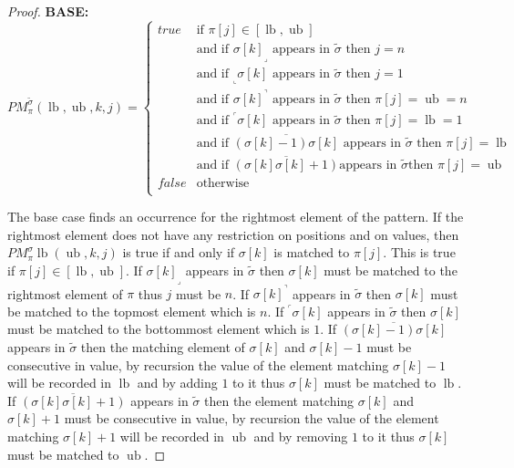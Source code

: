 \documentclass[a4paper]{llncs}
\newcommand{\ptext}{\pi}
\newcommand{\ppattern}{\sigma}
\newcommand{\PM}{PM}
\DeclareMathOperator{\lb}{lb}
\DeclareMathOperator{\ub}{ub}
\begin{document}
\begin{proof}
\noindent\textbf{BASE:} \\
$$
\PM^{\widetilde{\sigma}}_{\ptext}(\lb,\ub,k,j)=
\begin{cases}
	true 	& \text{if $\ptext[j] \in [\lb,\ub ]$}\\
			& \text{and if ${\ppattern[k]}_\lrcorner$ appears in $\widetilde{\sigma}$ then $j=n$}\\
			& \text{and if $_\llcorner{\sigma[k]}$ appears in $\widetilde{\sigma}$ then $j=1$}\\
			& \text{and if ${\ppattern[k]}^\urcorner$ appears in $\widetilde{\sigma}$ then $\ptext[j]=\ub=n$}\\
			& \text{and if  $^\ulcorner{\ppattern[k]}$ appears in $\widetilde{\sigma}$ then $\ptext[j]=\lb=1$ } \\
			& \text{and if  $\overline{(\ppattern[k]-1)\ppattern[k]}$ appears in $\widetilde{\sigma}$ then $\ptext[j]=\lb$ }  \\
			& \text{and if  $\overline{(\ppattern[k]\ppattern[k]+1)}$
			appears in $\widetilde{\sigma}$
			then $\ptext[j]=\ub$}  \\

	false	& \text{otherwise} \\
\end{cases}
$$

The base case finds an occurrence for the rightmost element of the pattern. If the rightmost element does not have any restriction on positions and on values, then $\PM^{\sigma}_{\ptext}{\lb}(\ub,k,j)$ is true if and only if $\ppattern[k]$ is matched to $\ptext[j]$. This is true if $\ptext[j] \in [\lb,\ub]$. If ${\ppattern[k]}_\lrcorner$ appears in $\widetilde{\sigma}$ then $\ppattern[k]$ must be matched to the rightmost element of $\pi$ thus $j$ must be $n$. If ${\ppattern[k]}^\urcorner$ appears in $\widetilde{\sigma}$ then $\ppattern[k]$ must be matched to the topmost element which is $n$. If $^\ulcorner{\ppattern[k]}$ appears in $\widetilde{\sigma}$ then $\ppattern[k]$ must be matched to the bottommost element which is $1$.
If  $\overline{(\ppattern[k]-1)\ppattern[k] }$ appears in $\widetilde{\sigma}$ then the matching element of $\ppattern[k]$ and $\ppattern[k]-1$ must be consecutive in value, by recursion the value of the element matching $\ppattern[k]-1$ will be recorded in $\lb$ and by adding $1$ to it thus $\ppattern[k]$ must be matched to $\lb$.
If  $\overline{(\ppattern[k]\ppattern[k]+1)}$ appears in $\widetilde{\sigma}$ then the element matching $\ppattern[k]$ and $\ppattern[k]+1$ must be consecutive in value, by recursion the value of the  element matching $\ppattern[k]+1$ will be recorded in $\ub$ and by removing $1$ to it thus $\ppattern[k]$ must be matched to $\ub$.



\end{proof}
\end{document}
